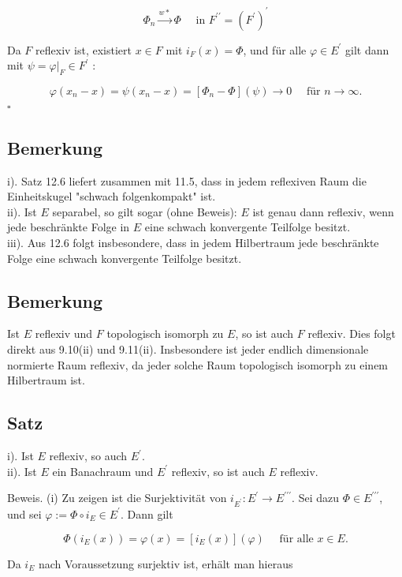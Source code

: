 \documentclass[10pt, letterpaper]{article}
\begin{document}
$$
\Phi_{n} \xrightarrow{w *} \Phi \quad \text { in } F^{\prime \prime}=\left(F^{\prime}\right)^{\prime}
$$

Da $F$ reflexiv ist, existiert $x \in F$ mit $i_{F}(x)=\Phi$, und für alle $\varphi \in E^{\prime}$ gilt dann mit $\psi=\left.\varphi\right|_{F} \in F^{\prime}$ :

$$
\varphi\left(x_{n}-x\right)=\psi\left(x_{n}-x\right)=\left[\Phi_{n}-\Phi\right](\psi) \rightarrow 0 \quad \text { für } n \rightarrow \infty .
$$ \(\square\)

\subsection*{Bemerkung}
i). Satz 12.6 liefert zusammen mit 11.5, dass in jedem reflexiven Raum die Einheitskugel "schwach folgenkompakt" ist.\\
ii). Ist $E$ separabel, so gilt sogar (ohne Beweis): $E$ ist genau dann reflexiv, wenn jede beschränkte Folge in $E$ eine schwach konvergente Teilfolge besitzt.\\
iii). Aus 12.6 folgt insbesondere, dass in jedem Hilbertraum jede beschränkte Folge eine schwach konvergente Teilfolge besitzt.

\subsection*{Bemerkung}
Ist $E$ reflexiv und $F$ topologisch isomorph zu $E$, so ist auch $F$ reflexiv. Dies folgt direkt aus 9.10(ii) und 9.11(ii). Insbesondere ist jeder endlich dimensionale normierte Raum reflexiv, da jeder solche Raum topologisch isomorph zu einem Hilbertraum ist.

\subsection*{Satz}
i). Ist $E$ reflexiv, so auch $E^{\prime}$.\\
ii). Ist $E$ ein Banachraum und $E^{\prime}$ reflexiv, so ist auch $E$ reflexiv.

Beweis. (i) Zu zeigen ist die Surjektivität von $i_{E^{\prime}}: E^{\prime} \rightarrow E^{\prime \prime \prime}$. Sei dazu $\Phi \in E^{\prime \prime \prime}$, und sei $\varphi:=\Phi \circ i_{E} \in E^{\prime}$. Dann gilt

$$
\Phi\left(i_{E}(x)\right)=\varphi(x)=\left[i_{E}(x)\right](\varphi) \quad \text { für alle } x \in E .
$$

Da $i_{E}$ nach Voraussetzung surjektiv ist, erhält man hieraus
\end{document}
